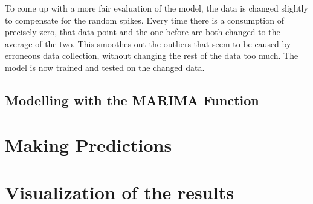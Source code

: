 \noindent To come up with a more fair evaluation of the model, the data is changed slightly to compensate for the random spikes. Every time there is a consumption of precisely zero, that data point and the one before are both changed to the average of the two. This smoothes out the outliers that seem to be caused by erroneous data collection, without changing the rest of the data too much. The model is now trained and tested on the changed data. 







\subsection{Modelling with the MARIMA Function}




\section{Making Predictions}

\section{Visualization of the results} 

